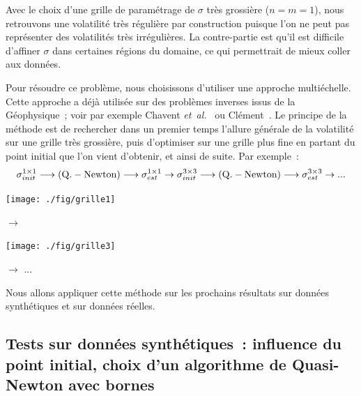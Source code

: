 Avec le choix d'une grille de param\'etrage de $\sigma$ tr\`es 
grossi\`ere ($n = m = 1$), nous retrouvons une volatilit\'e 
tr\`es r\'eguli\`ere par construction puisque l'on ne peut 
pas repr\'esenter des volatilit\'es tr\`es irr\'eguli\`eres. 
La contre-partie est qu'il est difficile d'affiner $\sigma$ 
dans certaines r\'egions du domaine, ce qui permettrait 
de mieux coller aux donn\'ees.

Pour r\'esoudre ce probl\`eme, nous choisissons d'utiliser 
une approche multi\'echelle. Cette approche a d\'ej\`a utilis\'ee 
sur des probl\`emes inverses issus de la G\'eophysique~; voir par 
exemple Chavent {\em et~al.}~\cite{bun:geo:95} ou 
Cl\'ement~\cite{fcl:inria:99}. Le principe de la m\'ethode 
est de rechercher dans un premier temps l'allure g\'en\'erale 
de la volatilit\'e sur une grille tr\`es grossi\`ere, puis 
d'optimiser sur une grille plus fine en partant du point 
initial que l'on vient d'obtenir, et ainsi de suite. 
Par exemple~:
$$
\sigma_{init}^{1 \times 1} \longrightarrow 
{\rm (Q.-Newton)} \longrightarrow 
\sigma_{est}^{1 \times 1} \rightarrow 
\sigma_{init}^{3 \times 3} \longrightarrow 
{\rm (Q.-Newton)} \longrightarrow 
\sigma_{est}^{3 \times 3} \rightarrow ...
$$

\begin{center}
\begin{minipage}{4.5cm}
\centerline{\texttt{[image: ./fig/grille1]}}
\end{minipage}
$\longrightarrow$
\begin{minipage}{4.5cm}
\centerline{\texttt{[image: ./fig/grille3]}} 
\end{minipage}
$\longrightarrow$ ...
\end{center}

Nous allons appliquer cette m\'ethode sur les prochains 
r\'esultats sur donn\'ees synth\'etiques et sur donn\'ees 
r\'eelles.

\subsection{Tests sur donn\'ees synth\'etiques~: influence du 
point initial, choix d'un algorithme de Quasi-Newton avec bornes}
\label{SSEC:CALIB3}

